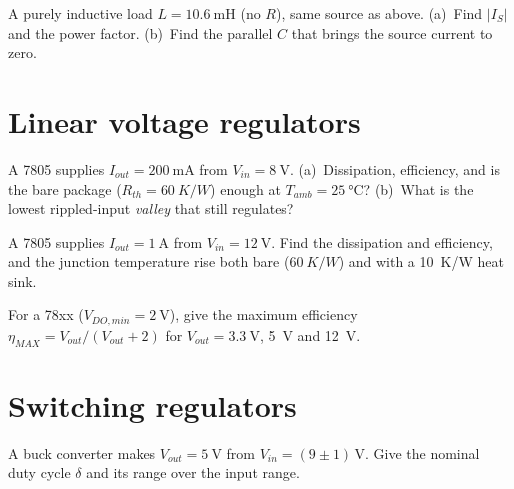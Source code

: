\documentclass[11pt,a4paper,oneside]{book}
\begin{document}
\begin{exercise}
A purely inductive load $L=\qty{10.6}{\milli\henry}$ (no $R$), same source as
above. (a)~Find $|I_S|$ and the power factor.
(b)~Find the parallel $C$ that brings the source current to zero.
\end{exercise}

\chapter{Linear voltage regulators}

\begin{exercise}
A 7805 supplies $I_{out}=\qty{200}{\milli\ampere}$ from $V_{in}=\qty{8}{\volt}$.
(a)~Dissipation, efficiency, and is the bare package ($R_{th}=\qty{60}{K/W}$)
enough at $T_{amb}=\qty{25}{\celsius}$?
(b)~What is the lowest rippled-input \emph{valley} that still regulates?
\end{exercise}

\begin{exercise}
A 7805 supplies $I_{out}=\qty{1}{\ampere}$ from $V_{in}=\qty{12}{\volt}$.
Find the dissipation and efficiency, and the junction temperature rise both bare
($\qty{60}{K/W}$) and with a \qty{10}{K/W} heat sink.
\end{exercise}

\begin{exercise}
For a 78xx ($V_{DO,min}=\qty{2}{\volt}$), give the maximum efficiency
$\eta_{MAX}=V_{out}/(V_{out}+2)$ for $V_{out}=\qty{3.3}{\volt}$,
\qty{5}{\volt} and \qty{12}{\volt}.
\end{exercise}

\chapter{Switching regulators}

\begin{exercise}
A buck converter makes $V_{out}=\qty{5}{\volt}$ from
$V_{in}=(9\pm1)\,\unit{\volt}$. Give the nominal duty cycle $\delta$ and its range
over the input range.
\end{exercise}
\end{document}
